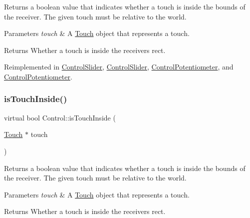 Returns a boolean value that indicates whether a touch is inside the bounds of the receiver. The given touch must be relative to the world.


\begin{DoxyParams}{Parameters}
{\em touch} & A \hyperlink{classTouch}{Touch} object that represents a touch.\\
\hline
\end{DoxyParams}
\begin{DoxyReturn}{Returns}
Whether a touch is inside the receiver\textquotesingle{}s rect. 
\end{DoxyReturn}


Reimplemented in \hyperlink{classControlSlider_adb6f9deedd5830443e3560db6ab21020}{Control\+Slider}, \hyperlink{classControlSlider_aa2a17ce15e2136612b651ab5c2e4398e}{Control\+Slider}, \hyperlink{classControlPotentiometer_aa2bdcab40a678f249ee083c466064795}{Control\+Potentiometer}, and \hyperlink{classControlPotentiometer_a484e056833311821d4ea2f3ec4bde790}{Control\+Potentiometer}.

\mbox{\label{classControl_af493eab0c7b003e9f18816d88c079952}} 
\subsubsection{\texorpdfstring{is\+Touch\+Inside()}{isTouchInside()}\hspace{0.1cm}{\footnotesize\ttfamily [2/2]}}
{\footnotesize\ttfamily virtual bool Control\+::is\+Touch\+Inside (\begin{DoxyParamCaption}\item[{\hyperlink{classTouch}{Touch} $\ast$}]{touch }\end{DoxyParamCaption})\hspace{0.3cm}{\ttfamily [virtual]}}

Returns a boolean value that indicates whether a touch is inside the bounds of the receiver. The given touch must be relative to the world.


\begin{DoxyParams}{Parameters}
{\em touch} & A \hyperlink{classTouch}{Touch} object that represents a touch.\\
\hline
\end{DoxyParams}
\begin{DoxyReturn}{Returns}
Whether a touch is inside the receiver\textquotesingle{}s rect. 
\end{DoxyReturn}


